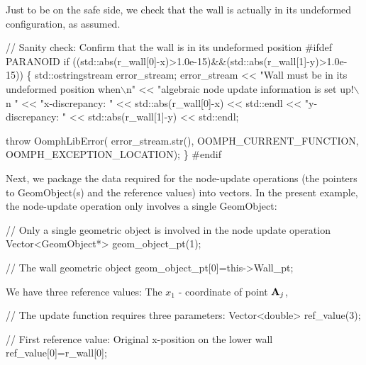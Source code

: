 Just to be on the safe side, we check that the wall is actually in its undeformed configuration, as assumed.


\begin{DoxyCodeInclude}
     \textcolor{comment}{// Sanity check: Confirm that the wall is in its undeformed position}
\textcolor{preprocessor}{#ifdef PARANOID}
     \textcolor{keywordflow}{if} ((std::abs(r\_wall[0]-x)>1.0e-15)&&(std::abs(r\_wall[1]-y)>1.0e-15))
      \{
       std::ostringstream error\_stream;
       error\_stream 
        << \textcolor{stringliteral}{"Wall must be in its undeformed position when\(\backslash\)n"}
        << \textcolor{stringliteral}{"algebraic node update information is set up!\(\backslash\)n "}
        << \textcolor{stringliteral}{"x-discrepancy: "} << std::abs(r\_wall[0]-x) << std::endl
        << \textcolor{stringliteral}{"y-discrepancy: "} << std::abs(r\_wall[1]-y) << std::endl;
       
       \textcolor{keywordflow}{throw} OomphLibError(
        error\_stream.str(),
        OOMPH\_CURRENT\_FUNCTION,
        OOMPH\_EXCEPTION\_LOCATION);
      \}
\textcolor{preprocessor}{#endif       }

\end{DoxyCodeInclude}


Next, we package the data required for the node-\/update operations (the pointers to {\ttfamily Geom\+Object(s)} and the reference values) into vectors. In the present example, the node-\/update operation only involves a single {\ttfamily Geom\+Object\+:} 


\begin{DoxyCodeInclude}
     \textcolor{comment}{// Only a single geometric object is involved in the node update operation}
     Vector<GeomObject*> geom\_object\_pt(1);

     \textcolor{comment}{// The wall geometric object}
     geom\_object\_pt[0]=this->Wall\_pt;

\end{DoxyCodeInclude}


We have three reference values\+: The $ x_1 $ -\/ coordinate of point $ {\bf A}_j $,


\begin{DoxyCodeInclude}
     \textcolor{comment}{// The update function requires three parameters:}
     Vector<double> ref\_value(3);
     
     \textcolor{comment}{// First reference value: Original x-position on the lower wall }
     ref\_value[0]=r\_wall[0];

\end{DoxyCodeInclude}


